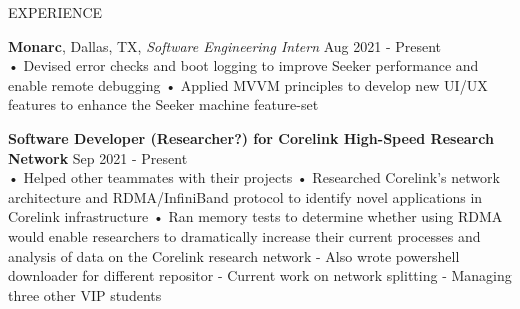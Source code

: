 \documentclass{resume} %
\begin{document}
\begin{rSection}{EXPERIENCE}

\textbf{\bf Monarc}, Dallas, TX, {\emph{Software Engineering Intern}} \hfill Aug 2021 - Present\\
• Devised error checks and boot logging to improve Seeker performance and enable remote debugging \newline
• Applied MVVM principles to develop new UI/UX features to enhance the Seeker machine feature-set \smallskip

\textbf{\bf Software Developer (Researcher?) for Corelink High-Speed Research Network} \hfill Sep 2021 - Present \\%
• Helped other teammates with their projects 
• Researched Corelink’s network architecture and RDMA/InfiniBand protocol to identify novel applications in Corelink infrastructure \newline
• Ran memory tests to determine whether using RDMA would enable researchers to dramatically increase their current processes and analysis of data on the Corelink research network
- Also wrote powershell downloader for different repositor
- Current work on network splitting 
- Managing three other VIP students

\end{rSection} 
\end{document}

